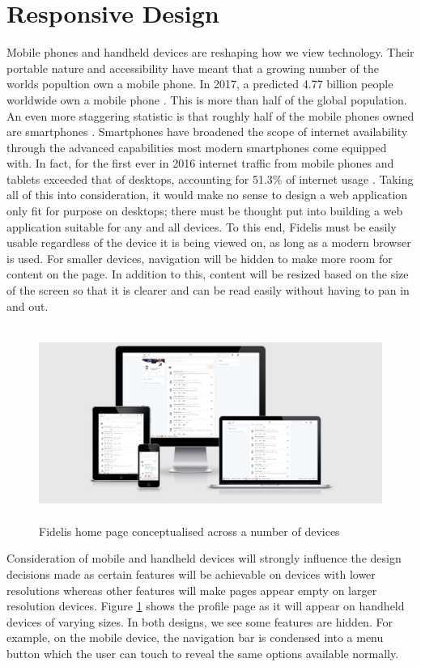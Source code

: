 \section{Responsive Design}
Mobile phones and handheld devices are reshaping how we view technology. Their portable nature and accessibility have meant that a growing number of the worlds popultion own a mobile phone. In 2017, a predicted 4.77 billion people worldwide own a mobile phone \cite{Statista:Mobile}. This is more than half of the global population. An even more staggering statistic is that roughly half of the mobile phones owned are smartphones \cite{Statista:Smartphones}. Smartphones have broadened the scope of internet availability through the advanced capabilities most modern smartphones come equipped with. In fact, for the first ever in 2016 internet traffic from mobile phones and tablets exceeded that of desktops, accounting for 51.3\% of internet usage \cite{StatCounter:MobileInternetTraffic}. Taking all of this into consideration, it would make no sense to design a web application only fit for purpose on desktops; there must be thought put into building a web application suitable for any and all devices. To this end, Fidelis must be easily usable regardless of the device it is being viewed on, as long as a modern browser is used. For smaller devices, navigation will be hidden to make more room for content on the page. In addition to this, content will be resized based on the size of the screen so that it is clearer and can be read easily without having to pan in and out.

\begin{figure}[H]
	\centering
	\includegraphics[height=2.5in]{Images/Design/ResponsivePages}
	\caption{Fidelis home page conceptualised across a number of devices}
	\label{fig:responsive}
\end{figure}

Consideration of mobile and handheld devices will strongly influence the design decisions made as certain features will be achievable on devices with lower resolutions whereas other features will make pages appear empty on larger resolution devices. Figure \ref{fig:responsive} shows the profile page as it will appear on handheld devices of varying sizes. In both designs, we see some features are hidden. For example, on the mobile device, the navigation bar is condensed into a menu button which the user can touch to reveal the same options available normally. 